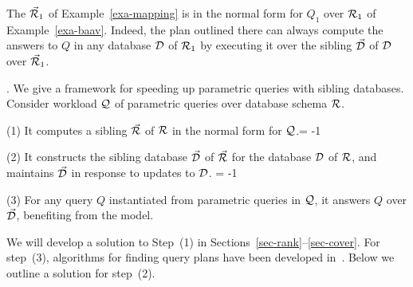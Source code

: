
\begin{example}\label{exa-norm}
The \bds $\vec{{\mathcal R}}_{1}$ of Example~\ref{exa-mapping} is in the normal
form for $Q_{1}$ over ${\mathcal R}_{1}$ of Example~\ref{exa-baav}. Indeed,
the plan outlined %
there %
can always compute the answers
to $Q$ in any database $\mathcal D$ of ${\mathcal R}_{1}$ by executing it over the
sibling $\vec{\mathcal D}$ of $\mathcal D$ over \bds $\vec{{\mathcal R}}_{1}$.
\end{example}
\vspace{-0.4ex}







. We give a framework for speeding up
parametric queries with sibling \baav databases. Consider
workload $\mathcal Q$ of parametric queries over database schema ${\mathcal R}$.

\sstab (1) It computes a sibling \bds $\vec{{\mathcal R}}$ of ${\mathcal R}$ in the
normal form for $\mathcal Q$.\looseness = -1

\sstab (2) It constructs the sibling \baav database $\vec{\mathcal D}$ of
$\vec{{\mathcal R}}$ for the database $\mathcal D$ of ${\mathcal R}$, and maintains $\vec{\mathcal D}$ in
response to updates to $\mathcal D$.
\looseness = -1


\sstab (3) For any query $Q$ instantiated from parametric queries
in $\mathcal Q$, it answers $Q$ over $\vec{\mathcal D}$, benefiting from the \baav
model.



\vspace{0.8ex}
We will develop a solution to Step~(1)
in Sections~\ref{sec-rank}--\ref{sec-cover}.
For step~(3), algorithms for finding query plans
have been developed in~\cite{VLDB19}.
Below we outline a solution for step~(2).

